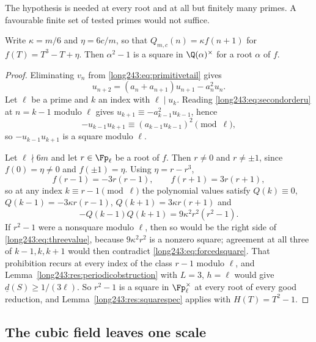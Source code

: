 The hypothesis is needed at every root and at all but finitely many primes.  A
favourable finite set of tested primes would not suffice.

\begin{proposition}\label{long243:res:transportsquare}
Write $\kappa=m/6$ and $\eta=6c/m$, so that $Q_{m,c}(n)=\kappa f(n+1)$ for
$f(T)=T^3-T+\eta$.  Then $\alpha^2-1$ is a square in $\Q(\alpha)^\times$ for a
root $\alpha$ of $f$.
\end{proposition}

\begin{proof}
Eliminating $v_n$ from \eqref{long243:eq:primitivetail} gives
\begin{equation}\label{long243:eq:secondorderu}
 u_{n+2}=(a_n+a_{n+1})u_{n+1}-a_n^2u_n .
\end{equation}
Let $\ell$ be a prime and $k$ an index with $\ell\mid u_k$.  Reading
\eqref{long243:eq:secondorderu} at $n=k-1$ modulo $\ell$ gives
$u_{k+1}\equiv-a_{k-1}^2u_{k-1}$, hence
\begin{equation}\label{long243:eq:forcedsquare}
 -u_{k-1}u_{k+1}\equiv(a_{k-1}u_{k-1})^2 \pmod\ell,
\end{equation}
so $-u_{k-1}u_{k+1}$ is a square modulo $\ell$.

Let $\ell\nmid6m$ and let $r\in\Fp_\ell$ be a root of $f$.  Then $r\ne0$ and
$r\ne\pm1$, since $f(0)=\eta\ne0$ and $f(\pm1)=\eta$.  Using $\eta=r-r^3$,
\[
 f(r-1)=-3r(r-1),\qquad f(r+1)=3r(r+1),
\]
so at any index $k\equiv r-1\pmod\ell$ the polynomial values satisfy
$Q(k)\equiv0$, $Q(k-1)=-3\kappa r(r-1)$, $Q(k+1)=3\kappa r(r+1)$ and
\begin{equation}\label{long243:eq:threevalue}
 -Q(k-1)Q(k+1)=9\kappa^2r^2(r^2-1).
\end{equation}
If $r^2-1$ were a nonsquare modulo $\ell$, then so would be the right side of
\eqref{long243:eq:threevalue}, because $9\kappa^2r^2$ is a nonzero square; agreement at
all three of $k-1,k,k+1$ would then contradict \eqref{long243:eq:forcedsquare}.  That
prohibition recurs at every index of the class $r-1$ modulo $\ell$, and
Lemma~\ref{long243:res:periodicobstruction} with $L=3$, $h=\ell$ would give
$\underline d(S)\ge1/(3\ell)$.  So $r^2-1$ is a square in $\Fp_\ell^\times$ at
every root of every good reduction, and Lemma~\ref{long243:res:squarespec} applies with
$H(T)=T^2-1$.
\end{proof}

\subsection{The cubic field leaves one scale}

